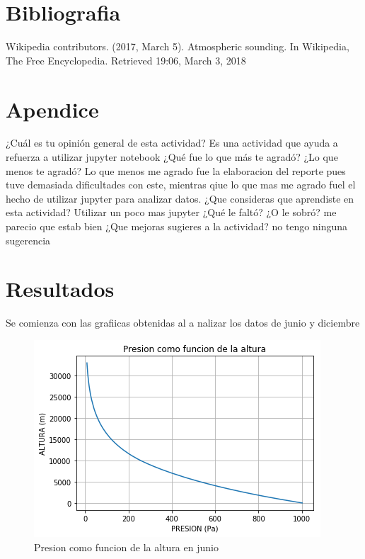 \documentclass{article}
\begin{document}
\section{Bibliografia}
Wikipedia contributors. (2017, March 5). Atmospheric sounding. In Wikipedia, The Free Encyclopedia. Retrieved 19:06, March 3, 2018

\section{Apendice}
¿Cuál es tu opinión general de esta actividad?
\newline
Es una actividad que ayuda a refuerza a utilizar jupyter notebook
\newline
¿Qué fue lo que más te agradó? ¿Lo que menos te agradó?
\newline
Lo que menos me agrado fue la elaboracion del reporte pues tuve demasiada dificultades con este, mientras qiue lo que mas me agrado fuel el hecho de utilizar jupyter para analizar datos.
\newline
¿Que consideras que aprendiste en esta actividad?
\newline
Utilizar un poco mas jupyter
\newline
¿Qué le faltó? ¿O le sobró?
\newline
me parecio que estab bien
\newline
¿Que mejoras sugieres a la actividad?
\newline
no tengo ninguna sugerencia


\section{Resultados}

Se comienza con las grafiicas obtenidas al a nalizar los datos de junio y diciembre
\begin{figure}[h]
  \centering
  \includegraphics[scale=0.5]{presionj.png}
  \caption{Presion como funcion de la altura en junio }
\end{figure}
\end{document}
